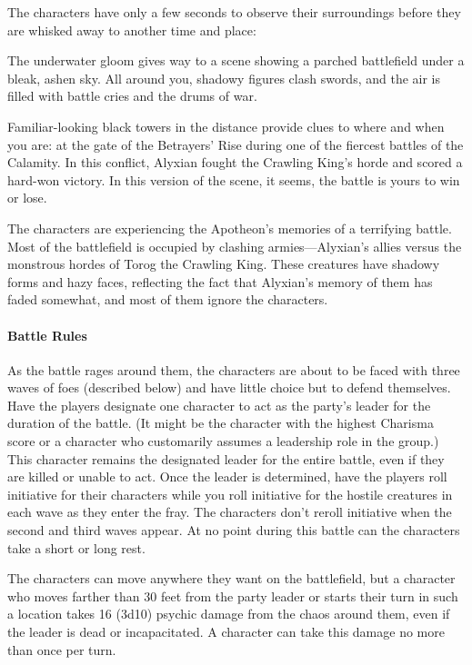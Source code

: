 \documentclass[10pt,a4paper,twoside,bg=print,twocolumn,openany,nodeprecatedcode]{dndbook}
\begin{document}
The characters have only a few seconds to observe their surroundings before they are whisked away to another time and place:

\begin{DndReadAloud}{}
The underwater gloom gives way to a scene showing a parched battlefield under a bleak, ashen sky. All around you, shadowy figures clash swords, and the air is filled with battle cries and the drums of war.

Familiar-looking black towers in the distance provide clues to where and when you are: at the gate of the Betrayers' Rise during one of the fiercest battles of the Calamity. In this conflict, Alyxian fought the Crawling King's horde and scored a hard-won victory. In this version of the scene, it seems, the battle is yours to win or lose.

\end{DndReadAloud}

The characters are experiencing the Apotheon's memories of a terrifying battle. Most of the battlefield is occupied by clashing armies—Alyxian's allies versus the monstrous hordes of Torog the Crawling King. These creatures have shadowy forms and hazy faces, reflecting the fact that Alyxian's memory of them has faded somewhat, and most of them ignore the characters.

\paragraph{Battle Rules}
As the battle rages around them, the characters are about to be faced with three waves of foes (described below) and have little choice but to defend themselves. Have the players designate one character to act as the party's leader for the duration of the battle. (It might be the character with the highest Charisma score or a character who customarily assumes a leadership role in the group.) This character remains the designated leader for the entire battle, even if they are killed or unable to act. Once the leader is determined, have the players roll initiative for their characters while you roll initiative for the hostile creatures in each wave as they enter the fray. The characters don't reroll initiative when the second and third waves appear. At no point during this battle can the characters take a short or long rest.

The characters can move anywhere they want on the battlefield, but a character who moves farther than 30 feet from the party leader or starts their turn in such a location takes 16 (3d10) psychic damage from the chaos around them, even if the leader is dead or incapacitated. A character can take this damage no more than once per turn.
\end{document}

